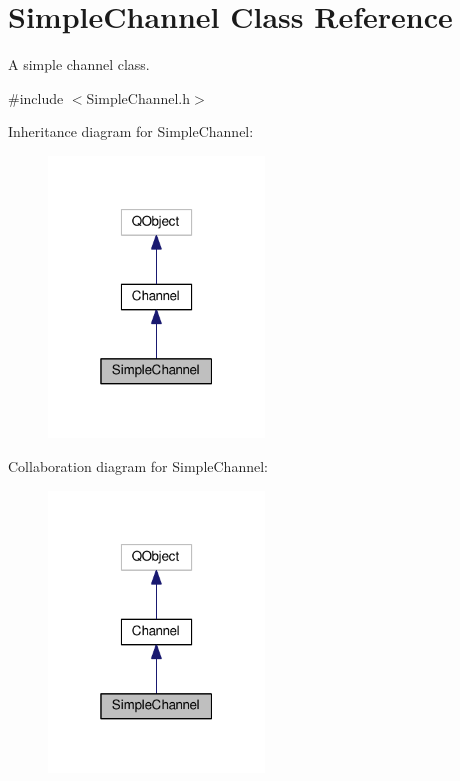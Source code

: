 \hypertarget{classSimpleChannel}{}\section{Simple\+Channel Class Reference}
\label{classSimpleChannel}


A simple channel class.  




{\ttfamily \#include $<$Simple\+Channel.\+h$>$}



Inheritance diagram for Simple\+Channel\+:\nopagebreak
\begin{figure}[H]
\begin{center}
\leavevmode
\includegraphics[width=163pt]{classSimpleChannel__inherit__graph}
\end{center}
\end{figure}


Collaboration diagram for Simple\+Channel\+:\nopagebreak
\begin{figure}[H]
\begin{center}
\leavevmode
\includegraphics[width=163pt]{classSimpleChannel__coll__graph}
\end{center}
\end{figure}
